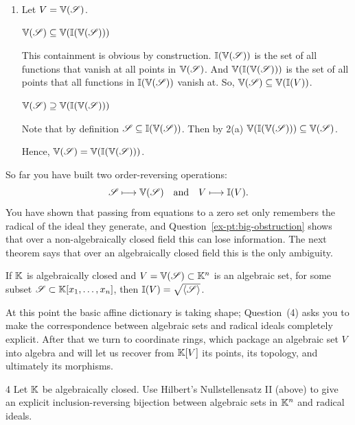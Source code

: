 \documentclass[Notebook.tex]{subfiles}
\begin{document}
\begin{solution}
\begin{enumerate}[label=(\alph*),ref=\theenumi\alph*]
        \item Let $V =\mathbb V(\operatorname{\mathscr S})$. 
        
        $\mathbb V(\operatorname{\mathscr S}) \subseteq \mathbb V(\mathbb I(\mathbb V(\operatorname{\mathscr S})))$

        This containment is obvious by construction. $\mathbb I(\mathbb V(\operatorname{\mathscr S}))$ is the set of all functions that vanish at all points in $\mathbb V(\operatorname{\mathscr S})$. And $\mathbb V(\mathbb I(\mathbb V(\operatorname{\mathscr S})))$ is the set of all points that all functions in $\mathbb I(\mathbb V(\operatorname{\mathscr S}))$ vanish at. So, $\mathbb V(\operatorname{\mathscr S}) \subseteq \mathbb V(\mathbb I(V))$. 

        \phantom{A}

        $\mathbb V(\operatorname{\mathscr S}) \supseteq \mathbb V(\mathbb I(\mathbb V(\operatorname{\mathscr S})))$

        Note that by definition $\operatorname{\mathscr S} \subseteq \mathbb I(\mathbb V(\operatorname{\mathscr S}))$. Then by 2(a) $\mathbb V(\mathbb I(\mathbb V(\operatorname{\mathscr S}))) \subseteq \mathbb V(\operatorname{\mathscr S})$.
        
        Hence, $\mathbb V(\operatorname{\mathscr S}) = \mathbb V(\mathbb I(\mathbb V(\operatorname{\mathscr S})))$.
    \end{enumerate}    
\end{solution}

\newpage

\hrulefill
 
So far you have built two order-reversing operations:
\[
\operatorname{\mathscr S} \longmapsto \mathbb V(\operatorname{\mathscr S})
\quad\text{and}\quad
V \longmapsto \mathbb I(V).
\]
You have shown that passing from equations to a zero set only remembers the radical of the ideal they generate, and Question~\ref{ex-pt:big-obstruction} shows that over a non-algebraically closed field this can lose information. The next theorem says that over an algebraically closed field this is the only ambiguity.
 
\begin{theorem} If $\mathbb K$ is algebraically closed and $V = \mathbb V(\operatorname{\mathscr S}) \subset \mathbb K^n$ is an algebraic set, for some subset $\operatorname{\mathscr S} \subset \mathbb K[x_1,\ldots,x_n]$, then $\mathbb I(V) = \sqrt{\langle \operatorname{\mathscr S} \rangle}$. 
\end{theorem}  

At this point the basic affine dictionary is taking shape; Question~(4) asks you to make the correspondence between algebraic sets and radical ideals completely explicit. After that we turn to coordinate rings, which package an algebraic set $V$ into algebra and will let us recover from $\mathbb K[V]$ its points, its topology, and ultimately its morphisms.

\hrulefill

\begin{problem}{4}
     Let $\mathbb K$ be algebraically closed. Use Hilbert's Nullstellensatz II (above) to give an explicit inclusion-reversing bijection between algebraic sets in $\mathbb K^n$ and radical ideals. 
\end{problem}
\end{document}
